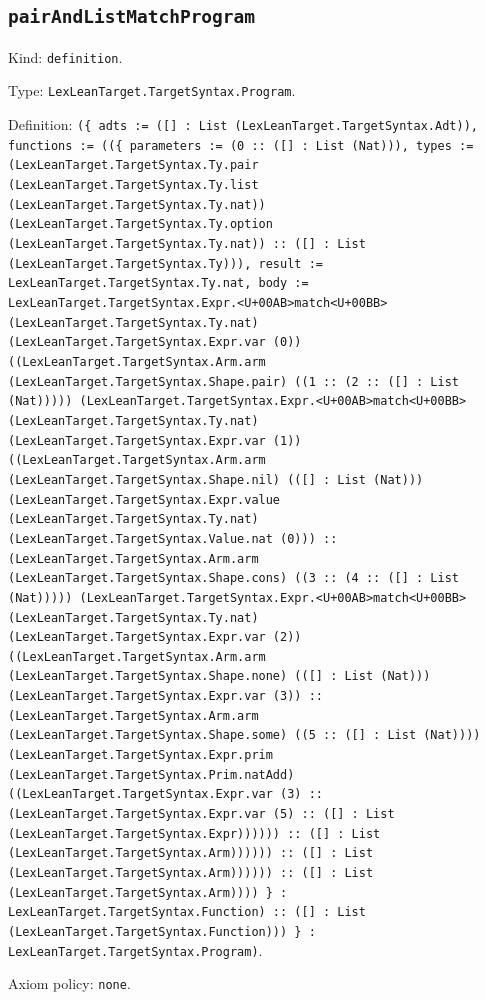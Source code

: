 \documentclass[11pt]{article}
\begin{document}
\subsection*{\texttt{pairAndListMatchProgram}}
\noindent Kind: \texttt{definition}.\par
\noindent Type: \texttt{LexLeanTarget.TargetSyntax.Program}.\par
\noindent Definition: \texttt{(\{ adts := ([] : List (LexLeanTarget.TargetSyntax.Adt)), functions := ((\{ parameters := (0 :: ([] : List (Nat))), types := (LexLeanTarget.TargetSyntax.Ty.pair (LexLeanTarget.TargetSyntax.Ty.list (LexLeanTarget.TargetSyntax.Ty.nat)) (LexLeanTarget.TargetSyntax.Ty.option (LexLeanTarget.TargetSyntax.Ty.nat)) :: ([] : List (LexLeanTarget.TargetSyntax.Ty))), result := LexLeanTarget.TargetSyntax.Ty.nat, body := LexLeanTarget.TargetSyntax.Expr.<U+00AB>match<U+00BB> (LexLeanTarget.TargetSyntax.Ty.nat) (LexLeanTarget.TargetSyntax.Expr.var (0)) ((LexLeanTarget.TargetSyntax.Arm.arm (LexLeanTarget.TargetSyntax.Shape.pair) ((1 :: (2 :: ([] : List (Nat))))) (LexLeanTarget.TargetSyntax.Expr.<U+00AB>match<U+00BB> (LexLeanTarget.TargetSyntax.Ty.nat) (LexLeanTarget.TargetSyntax.Expr.var (1)) ((LexLeanTarget.TargetSyntax.Arm.arm (LexLeanTarget.TargetSyntax.Shape.nil) (([] : List (Nat))) (LexLeanTarget.TargetSyntax.Expr.value (LexLeanTarget.TargetSyntax.Ty.nat) (LexLeanTarget.TargetSyntax.Value.nat (0))) :: (LexLeanTarget.TargetSyntax.Arm.arm (LexLeanTarget.TargetSyntax.Shape.cons) ((3 :: (4 :: ([] : List (Nat))))) (LexLeanTarget.TargetSyntax.Expr.<U+00AB>match<U+00BB> (LexLeanTarget.TargetSyntax.Ty.nat) (LexLeanTarget.TargetSyntax.Expr.var (2)) ((LexLeanTarget.TargetSyntax.Arm.arm (LexLeanTarget.TargetSyntax.Shape.none) (([] : List (Nat))) (LexLeanTarget.TargetSyntax.Expr.var (3)) :: (LexLeanTarget.TargetSyntax.Arm.arm (LexLeanTarget.TargetSyntax.Shape.some) ((5 :: ([] : List (Nat)))) (LexLeanTarget.TargetSyntax.Expr.prim (LexLeanTarget.TargetSyntax.Prim.natAdd) ((LexLeanTarget.TargetSyntax.Expr.var (3) :: (LexLeanTarget.TargetSyntax.Expr.var (5) :: ([] : List (LexLeanTarget.TargetSyntax.Expr)))))) :: ([] : List (LexLeanTarget.TargetSyntax.Arm)))))) :: ([] : List (LexLeanTarget.TargetSyntax.Arm)))))) :: ([] : List (LexLeanTarget.TargetSyntax.Arm)))) \} : LexLeanTarget.TargetSyntax.Function) :: ([] : List (LexLeanTarget.TargetSyntax.Function))) \} : LexLeanTarget.TargetSyntax.Program)}.\par
\noindent Axiom policy: \texttt{none}.\par
\end{document}
